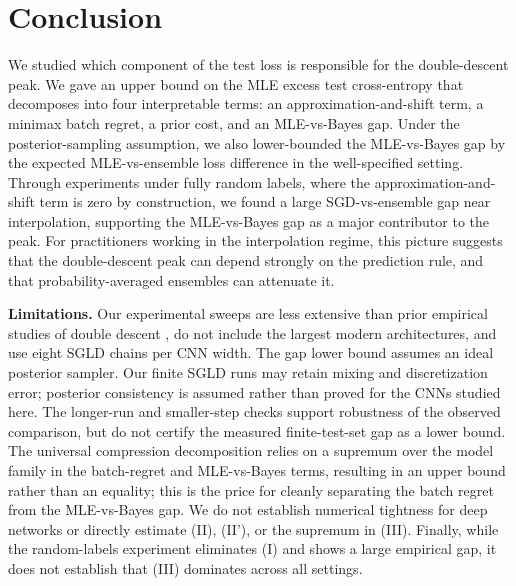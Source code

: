 
\section{Conclusion}
\label{sec:conclusion}

We studied which component of the test loss is responsible for the
double-descent peak. We gave an upper bound on the MLE excess test cross-entropy
that decomposes into four interpretable terms: an approximation-and-shift
term, a minimax batch regret, a prior cost, and an MLE-vs-Bayes gap.
Under the posterior-sampling assumption, we also lower-bounded the
MLE-vs-Bayes gap by the expected MLE-vs-ensemble loss difference in the
well-specified setting. Through experiments under
fully random labels, where the approximation-and-shift term is zero by
construction, we found a large SGD-vs-ensemble gap near interpolation,
supporting the MLE-vs-Bayes gap as a major contributor to the peak. For practitioners
working in the interpolation regime, this picture suggests that the
double-descent peak can depend strongly on the prediction rule, and that
probability-averaged ensembles can attenuate it.

\textbf{Limitations.} Our experimental sweeps are less extensive than
prior empirical studies of double descent \citep{nakkiran2021deep}, do
not include the largest modern architectures, and use eight SGLD chains
per CNN width. The gap lower bound assumes an ideal posterior sampler.
Our finite SGLD runs may retain mixing and discretization error;
posterior consistency is assumed rather than proved for the CNNs studied here.
The longer-run and smaller-step checks support robustness of the observed
comparison, but do not certify the measured finite-test-set gap as a lower
bound. The universal compression decomposition relies
on a supremum over the model family in the batch-regret and MLE-vs-Bayes
terms, resulting in an upper bound rather than an equality; this is the
price for cleanly separating the batch regret from the MLE-vs-Bayes gap.
We do not establish numerical tightness for deep networks or directly
estimate (II), (II'), or the supremum in (III). Finally, while the
random-labels experiment eliminates (I) and shows a large empirical gap,
it does not establish that (III) dominates across all settings.
